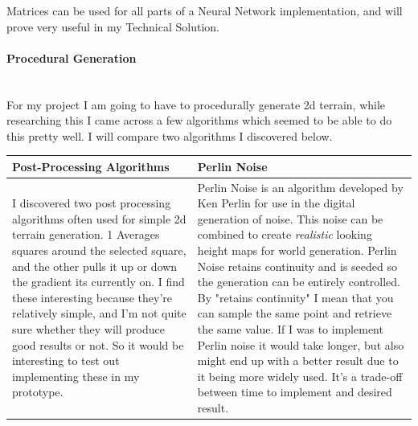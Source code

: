 \begin{flushleft}
                        Matrices can be used for all parts of a Neural Network implementation, and will prove very useful in my Technical
                        Solution. \\

                    \paragraph{Procedural Generation} \mbox{} \\
                        \vspace{0.2cm}
                        For my project I am going to have to procedurally generate 2d terrain, while researching this I came across a few algorithms
                        which seemed to be able to do this pretty well. I will compare two algorithms I discovered below.
                        
                        \begin{center}
                            \begin{tabular}{| L{6cm} | L{6cm} |}
                                \hline
                                {\large Post-Processing Algorithms} & {\large Perlin Noise} \\
                                \hline
                                I discovered two post processing algorithms often used for simple 2d terrain generation. 1 Averages squares 
                                around the selected square, and the other pulls it up or down the gradient its currently on.
                                I find these interesting because they're relatively simple, and I'm not quite sure whether they will produce good results or not. 
                                So it would be interesting to test out implementing these in my prototype.
                                &
                                Perlin Noise is an algorithm developed by Ken Perlin for use in the digital generation of noise.
                                This noise can be combined to create \textit{realistic} looking height maps for world generation.
                                Perlin Noise retains continuity and is seeded so the generation can be entirely controlled.
                                By "retains continuity" I mean that you can sample the same point and retrieve the same value. 
                                If I was to implement Perlin noise it would take longer, but also might end up with a better result
                                due to it being more widely used. It's a trade-off between time to implement and desired result. \\
                                \hline
                            \end{tabular}
                        \end{center}
                        

\end{flushleft}

